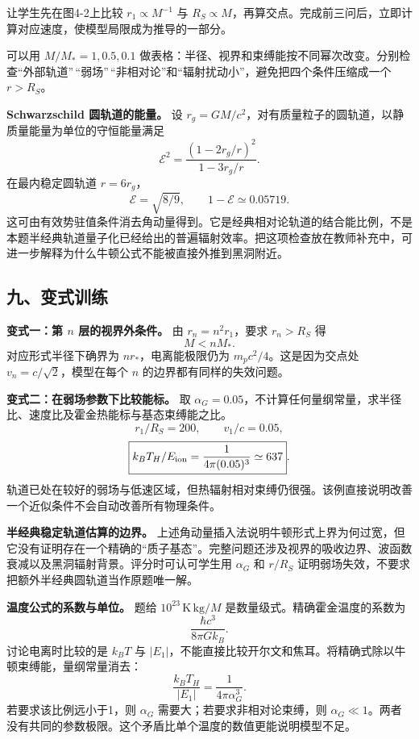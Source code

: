 \documentclass[12pt,a4paper,UTF8]{ctexart}
\begin{document}
让学生先在图4-2上比较 \(r_1\propto M^{-1}\) 与
\(R_S\propto M\)，再算交点。完成前三问后，立即计算对应速度，使模型局限成为推导的一部分。

可以用 \(M/M_*=1,0.5,0.1\)
做表格：半径、视界和束缚能按不同幂次改变。分别检查``外部轨道''\,``弱场''\,``非相对论''和``辐射扰动小''，避免把四个条件压缩成一个
\(r>R_S\)。

\textbf{Schwarzschild 圆轨道的能量。} 设
\(r_g=GM/c^2\)，对有质量粒子的圆轨道，以静质量能量为单位的守恒能量满足
\[
\mathcal E^2=\frac{(1-2r_g/r)^2}{1-3r_g/r}.
\] 在最内稳定圆轨道 \(r=6r_g\)， \[
\mathcal E=\sqrt{8/9},\qquad
1-\mathcal E\simeq0.05719.
\]
这可由有效势驻值条件消去角动量得到。它是经典相对论轨道的结合能比例，不是本题半经典轨道量子化已经给出的普遍辐射效率。把这项检查放在教师补充中，可进一步解释为什么牛顿公式不能被直接外推到黑洞附近。

\subsection{九、变式训练}\label{ux4e5dux53d8ux5f0fux8badux7ec3-3}

\textbf{变式一：第 \(n\) 层的视界外条件。} 由 \(r_n=n^2r_1\)，要求
\(r_n>R_S\) 得 \[
\boxed{M<nM_*}.
\] 对应形式半径下确界为 \(nr_*\)，电离能极限仍为
\(m_pc^2/4\)。这是因为交点处 \(v_n=c/\sqrt2\)，模型在每个 \(n\)
的边界都有同样的失效问题。

\textbf{变式二：在弱场参数下比较能标。} 取
\(\alpha_G=0.05\)，不计算任何量纲常量，求半径比、速度比及霍金热能标与基态束缚能之比。
\[
\boxed{r_1/R_S=200},\qquad
\boxed{v_1/c=0.05},
\] \[
\boxed{k_BT_H/E_{\rm ion}=\frac{1}{4\pi(0.05)^3}\simeq637}.
\]
轨道已处在较好的弱场与低速区域，但热辐射相对束缚仍很强。该例直接说明改善一个近似条件不会自动改善所有物理条件。

\textbf{半经典稳定轨道估算的边界。}
上述角动量插入法说明牛顿形式上界为何过宽，但它没有证明存在一个精确的``质子基态''。完整问题还涉及视界的吸收边界、波函数衰减以及黑洞辐射背景。评分时可认可学生用
\(\alpha_G\) 和 \(r/R_S\)
证明弱场失效，不要求把额外半经典圆轨道当作原题唯一解。

\textbf{温度公式的系数与单位。} 题给 \(10^{23}\,\mathrm{K\,kg}/M\)
是数量级式。精确霍金温度的系数为 \[
\frac{\hbar c^3}{8\pi Gk_B}.
\] 讨论电离时比较的是 \(k_BT\) 与
\(|E_1|\)，不能直接比较开尔文和焦耳。将精确式除以牛顿束缚能，量纲常量消去：
\[
\frac{k_BT_H}{|E_1|}
=\frac1{4\pi\alpha_G^3}.
\] 若要求该比例远小于1，则 \(\alpha_G\) 需要大；若要求非相对论束缚，则
\(\alpha_G\ll1\)。两者没有共同的参数极限。这个矛盾比单个温度的数值更能说明模型不足。
\end{document}
